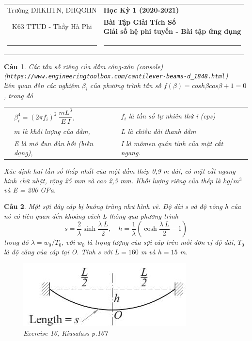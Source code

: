 \documentclass[11pt]{article}
\newtheorem{bt}{Câu}
\begin{document}
\begin{tabular*}
{\linewidth}{c>{\centering\hspace{0pt}} p{}}
Trường ĐHKHTN, ĐHQGHN & {\bf Học Kỳ 1 (2020-2021)}
\tabularnewline
K63 TTƯD - Thầy Hà Phi & {\bf Bài Tập Giải Tích Số \\ Giải số hệ phi tuyến - Bài tập ứng dụng}
\tabularnewline
\rule{1in}{1pt}  \small  & \rule{2in}{1pt} %
\tabularnewline

\end{tabular*}
%

\begin{bt} %
Các tần số riêng của dầm công-xôn (console) \\ (\verb|https://www.engineeringtoolbox.com/cantilever-beams-d_1848.html|) \\
liên quan đến các nghiệm $\beta_i$ của phương trình tần số $f(\beta) = cosh \beta cos \beta + 1 = 0$, trong đó
\hskip 4cm
\begin{tabular}{lll}
& $\beta_i^4 = (2 \pi f_i)^2 \ \dfrac{mL^3}{E \ I}$, \quad & $f_i$ là tần số tự nhiên thứ i (cps) \\
& $m$ là khối lượng của dầm, \quad & L là chiều dài thanh dầm \\
& E là mô đun đàn hồi (biến dạng), \quad & I là mômen quán tính của mặt cắt ngang.
\end{tabular}
%

\noindent Xác định hai tần số thấp nhất của một dầm thép 0,9 m dài, có mặt cắt ngang hình chữ nhật, rộng 25 mm và cao 2,5 mm. Khối lượng riêng của thép là
$kg/m^3$ và E = 200 GPa.
\end{bt}

\begin{bt}  %
Một sợi dây cáp bị buông trùng như hình vẽ. Độ dài s và độ võng h của nó có liên quan đến khoảng cách L thông qua phương trình
\begin{equation}
s = \dfrac{2}{\lambda} \sinh \dfrac{\lambda \ L}{2}, \quad 
h = \dfrac{1}{\lambda} \left( \cosh\dfrac{\lambda \ L}{2} - 1 \right)
\end{equation}
trong đó $\lambda = w_0/T_0$, với $w_0$ là trọng lượng của sợi cáp trên mỗi đơn vị độ dài, $T_0$ là độ căng của cáp tại O. Tính $s$ với $L = 160$ m và $h = 15$ m.
\begin{figure}[!h]
	\centering
	\includegraphics[width=0.4\linewidth]{suspended_cable}
	\caption{Exercise 16, Kiusalass p.167}
	\label{fig:suspendedcable}
\end{figure}
\end{bt}
\end{document}

